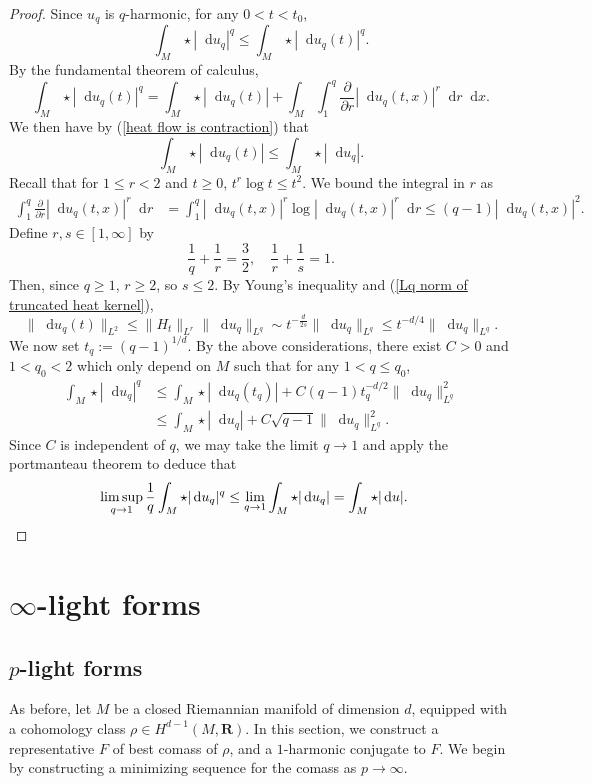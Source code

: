 \documentclass[reqno,11pt]{amsart}
\newcommand{\RR}{\mathbf{R}}
\newcommand*\dif{\mathop{}\!\mathrm{d}}
\theoremstyle{definition}
\numberwithin{equation}{section}
\begin{document}
\begin{proof}
Since $u_q$ is $q$-harmonic, for any $0 < t < t_0$,
$$\int_M \star |\dif u_q|^q \leq \int_M \star |\dif u_q(t)|^q.$$
By the fundamental theorem of calculus, 
$$\int_M \star |\dif u_q(t)|^q = \int_M \star |\dif u_q(t)| + \int_M \int_1^q \frac{\partial}{\partial r} |\dif u_q(t, x)|^r \dif r \dif x.$$
We then have by (\ref{heat flow is contraction}) that
$$\int_M \star |\dif u_q(t)| \leq \int_M \star |\dif u_q|.$$
Recall that for $1 \leq r < 2$ and $t \geq 0$, $t^r \log t \leq t^2$.
We bound the integral in $r$ as
\begin{align*}
\int_1^q \frac{\partial}{\partial r} |\dif u_q(t, x)|^r \dif r
&= \int_1^q |\dif u_q(t, x)|^r \log |\dif u_q(t, x)|^r \dif r 
\leq (q - 1) |\dif u_q(t, x)|^2.
\end{align*}
Define $r, s \in [1, \infty]$ by 
$$\frac{1}{q} + \frac{1}{r} = \frac{3}{2}, \quad \frac{1}{r} + \frac{1}{s} = 1.$$
Then, since $q \geq 1$, $r \geq 2$, so $s \leq 2$.
By Young's inequality and (\ref{Lq norm of truncated heat kernel}),
$$\|\dif u_q(t)\|_{L^2} \leq \|H_t\|_{L^r} \|\dif u_q\|_{L^q} \sim t^{-\frac{d}{2s}} \|\dif u_q\|_{L^q} \leq t^{-d/4} \|\dif u_q\|_{L^q}.$$
We now set $t_q := (q - 1)^{1/d}$.
By the above considerations, there exist $C > 0$ and $1 < q_0 < 2$ which only depend on $M$ such that for any $1 < q \leq q_0$,
\begin{align*}
\int_M \star |\dif u_q|^q 
&\leq \int_M \star |\dif u_q(t_q)| + C(q - 1)t_q^{-d/2} \|\dif u_q\|_{L^q}^2 \\
&\leq \int_M \star |\dif u_q| + C\sqrt{q - 1} \|\dif u_q\|_{L^q}^2.
\end{align*}
Since $C$ is independent of $q$, we may take the limit $q \to 1$ and apply the portmanteau theorem to deduce that 
\begin{align*}
\limsup_{q \to 1} \frac{1}{q} \int_M \star |\dif u_q|^q &\leq \lim_{q \to 1} \int_M \star |\dif u_q| = \int_M \star |\dif u|. \qedhere 
\end{align*}
\end{proof}

\section{\texorpdfstring{$\infty$-light forms}{Infinity-light forms}}
\subsection{\texorpdfstring{$p$-light forms}{p-light forms}}
As before, let $M$ be a closed Riemannian manifold of dimension $d$, equipped with a cohomology class $\rho \in H^{d - 1}(M, \RR)$.
In this section, we construct a representative $F$ of best comass of $\rho$, and a $1$-harmonic conjugate to $F$.
We begin by constructing a minimizing sequence for the comass as $p \to \infty$.
\end{document}
